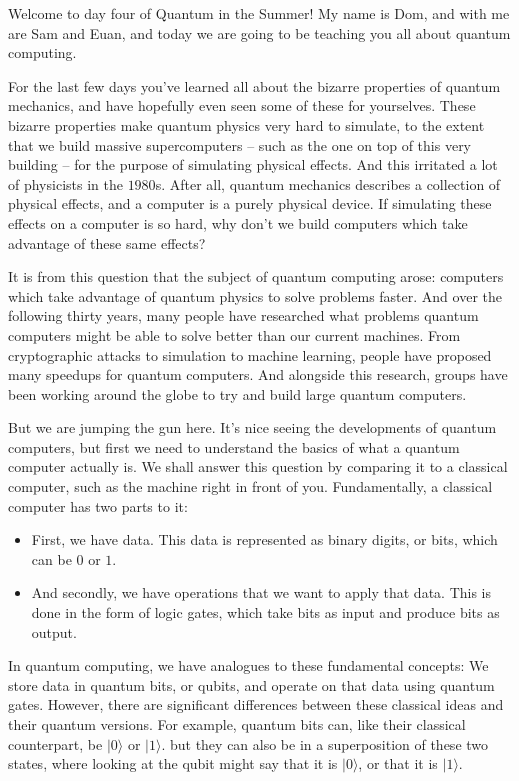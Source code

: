 \documentclass{article}
\begin{document}
Welcome to day four of Quantum in the Summer! My name is Dom, and with me are Sam and Euan, and today we are going to be teaching you all about quantum computing.

For the last few days you've learned all about the bizarre properties of quantum mechanics, and have hopefully even seen some of these for yourselves. These bizarre properties make quantum physics very hard to simulate, to the extent that we build massive supercomputers -- such as the one on top of this very building -- for the purpose of simulating physical effects. And this irritated a lot of physicists in the $1980$s. After all, quantum mechanics describes a collection of physical effects, and a computer is a purely physical device. If simulating these effects on a computer is so hard, why don't we build computers which take advantage of these same effects?

It is from this question that the subject of quantum computing arose: computers which take advantage of quantum physics to solve problems faster. And over the following thirty years, many people have researched what problems quantum computers might be able to solve better than our current machines. From cryptographic attacks to simulation to machine learning, people have proposed many speedups for quantum computers. And alongside this research, groups have been working around the globe to try and build large quantum computers.

But we are jumping the gun here. It's nice seeing the developments of quantum computers, but first we need to understand the basics of what a quantum computer actually is. We shall answer this question by comparing it to a classical computer, such as the machine right in front of you. Fundamentally, a classical computer has two parts to it:

\begin{itemize}
\item First, we have data. This data is represented as binary digits, or bits, which can be $0$ or $1$.
\item And secondly, we have operations that we want to apply that data. This is done in the form of logic gates, which take bits as input and produce bits as output.
\end{itemize}

In quantum computing, we have analogues to these fundamental concepts: We store data in quantum bits, or qubits, and operate on that data using quantum gates. However, there are significant differences between these classical ideas and their quantum versions. For example, quantum bits can, like their classical counterpart, be $|0\rangle$ or $|1\rangle$. but they can also be in a superposition of these two states, where looking at the qubit might say that it is $|0\rangle$, or that it is $|1\rangle$.
\end{document}
